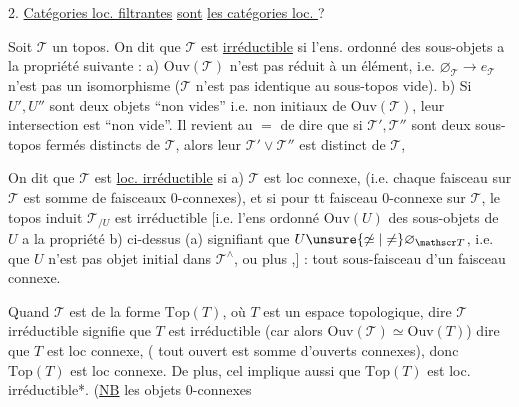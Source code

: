 2. \uline{Catégories loc. filtrantes} \uline{sont} \uline{les catégories loc.  } ?

Soit $\mathscr T$ un topos. On dit que $\mathscr T$ est \uline{irréductible}  si l'ens. ordonné  des sous-objets    a la propriété suivante :
a) $\mathrm{Ouv}(\mathscr T)$ n'est pas réduit à un élément, i.e. $\varnothing_{\mathscr T}\to e_{\mathscr T}$ n'est pas un isomorphisme ($\mathscr T$ n'est pas identique  au sous-topos vide).
b) Si $U',U''$ sont deux objets ``non vides'' i.e. non initiaux de $\mathrm{Ouv}(\mathscr T)$, leur  intersection est ``non vide''.
Il revient au $=$ de dire que si $\mathscr T',\mathscr T''$ sont deux sous-topos fermés distincts de $\mathscr T$, alors  leur  $\mathscr T'\vee\mathscr T''$ est distinct de $\mathscr T$, 

On dit que $\mathscr T$ est \uline{loc. irréductible} si 
a) $\mathscr T$ est loc connexe,  (i.e. chaque faisceau sur $\mathscr T$ est somme de faisceaux 0-connexes),
et si  pour tt faisceau 0-connexe  sur $\mathscr T$, le topos induit $\mathscr T_{/U}$ est irréductible  [i.e. l'ens  ordonné $\mathrm{Ouv}(U)$ des sous-objets de $U$\unsure{,} a la propriété b) ci-dessus (a) signifiant  que  $U\unsure{\not\simeq|\ne}\varnothing_{\mathscr T}$\unsure{\}}, i.e. que $U$ n'est pas objet initial dans $\mathscr T^{\wedge}$\unsure{\}}, ou plus ,] :  tout sous-faisceau d'un faisceau   connexe.

Quand $\mathscr T$ est de la forme  $\mathrm{Top}(T)$, où $T$ est un espace topologique, dire $\mathscr T$ irréductible signifie que $T$ est irréductible (car alors $\mathrm{Ouv}(\mathscr T)\simeq\mathrm{Ouv}(T)$\deleted{\unsure{\})}})\unsure{;}   dire  que $T$ est loc connexe,
 ( tout ouvert est somme  d'ouverts connexes), donc $\mathrm{Top}(T)$ est loc connexe. De plus, cel implique aussi que $\mathrm{Top}(T)$ est loc. irréductible*. (\uline{NB} les objets 0-connexes

